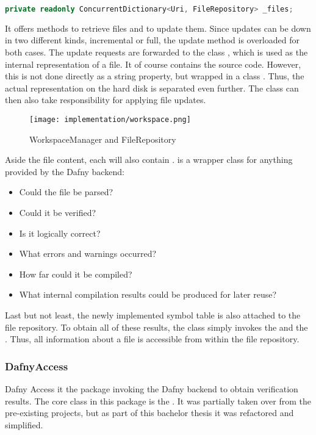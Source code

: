 \begin{lstlisting}[language=csharp, caption={Workspace Property}, captionpos=b, label={lst:workspaceproperty}]
private readonly ConcurrentDictionary<Uri, FileRepository> _files;
\end{lstlisting}

It offers methods to retrieve files and to update them.
Since updates can be down in two different kinds, incremental or full, the update method is overloaded for both cases.
The update requests are forwarded to the class , which is used as the internal representation of a file.
It of course contains the source code.
However, this is not done directly as a string property, but wrapped in a class .
Thus, the actual representation on the hard disk is separated even further.
The  class can then also take responsibility for applying file updates.\\

\begin{figure}[H]
    \centering
    \texttt{[image: implementation/workspace.png]}
    \caption{WorkspaceManager and FileRepository}
    \label{fig:worksapceAndRepo}
\end{figure}

Aside the file content, each  will also contain .
 is a wrapper class for anything provided by the Dafny backend:
\begin{itemize}
    \item Could the file be parsed?
    \item Could it be verified?
    \item Is it logically correct?
    \item What errors and warnings occurred?
    \item How far could it be compiled?
    \item What internal compilation results could be produced for later reuse?
\end{itemize}

Last but not least, the newly implemented symbol table is also attached to the file repository.
To obtain all of these results, the class simply invokes the  and the .
Thus, all information about a file is accessible from within the file repository.


\subsubsection{DafnyAccess}
Dafny Access it the package invoking the Dafny backend to obtain verification results.
The core class in this package is the .
It was partially taken over from the pre-existing projects, but as part of this bachelor thesis it was refactored and simplified.\\

